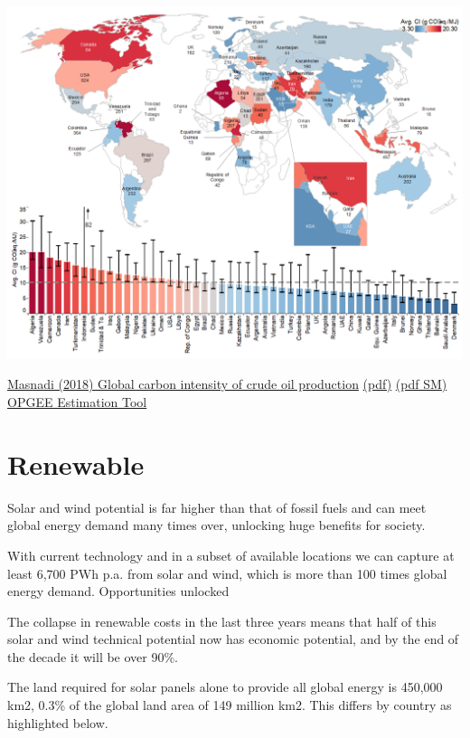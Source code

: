 \documentclass[
]{book}
\begin{document}
\includegraphics{fig/carbon_intensity_of_crude_oil_production.png}

\href{https://www.osti.gov/pages/biblio/1485127}{Masnadi (2018) Global carbon intensity of crude oil production}
\href{pdf/Masnadi_2018_Carbon_Intensity_of_Crude_Oil_Production.pdf}{(pdf)}
\href{pdf/Masnadi_2018_Carbon_Intensity_of_Crude_Oil_Production_SM.pdf}{(pdf SM)}
\href{https://eao.stanford.edu/research-areas/opgeehttps://eao.stanford.edu/research-areas/opgee}{OPGEE Estimation Tool}

\hypertarget{renewable}{%
\chapter{Renewable}\label{renewable}}

Solar and wind potential is far higher than that of fossil fuels and can meet global energy demand many times over, unlocking huge benefits for society.

With current technology and in a subset of available locations we can capture at least 6,700 PWh p.a. from solar and wind, which is more than 100 times global energy demand.
Opportunities unlocked

The collapse in renewable costs in the last three years means that half of this solar and wind technical potential now has economic potential, and by the end of the decade it will be over 90\%.

The land required for solar panels alone to provide all global energy is 450,000 km2, 0.3\% of the global land area of 149 million km2. This differs by country as highlighted below.
\end{document}
